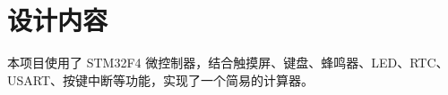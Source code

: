 \documentclass{theme-2639013-final}
\begin{document}

  

\section{设计内容}

本项目使用了 STM32F4 微控制器，结合触摸屏、键盘、蜂鸣器、LED、RTC、USART、按键中断等功能，实现了一个简易的计算器。
\end{document}

